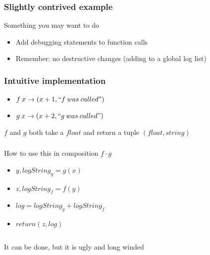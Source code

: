 \begin{frame}
    \frametitle{Slightly contrived example}
    \begin{block}{Something you may want to do}
        \begin{itemize}
            \item Add debugging statements to function calls
            \item Remember: no destructive changes (adding to a global log list)
        \end{itemize}
    \end{block}
\end{frame}

\begin{frame}[fragile]
    \frametitle{Intuitive implementation}
    \begin{block}{}
        \begin{itemize}
            \item $f \: x \rightarrow (x+1, ``f \: was \: called")$
            \item $g \: x \rightarrow (x+2, ``g \: was \: called")$
        \end{itemize}
    \end{block}
    \begin{block}{}
        $f$ and $g$ both take a $float$ and return a tuple $(float, string)$
    \end{block}
\end{frame}

\begin{frame}[fragile]
    \frametitle{}
    \begin{block}{How to use this in composition $f \cdot g$}
        \begin{itemize}
            \item $y, logString_g = g(x)$
            \item $z, logString_f = f(y)$
            \item $log = logString_g + logString_f$
            \item $return (z, log)$
        \end{itemize}
\begin{lstlisting}
\end{lstlisting}
    \end{block}
    \begin{block}{}
        It can be done, but it is ugly and long winded
    \end{block}
\end{frame}

